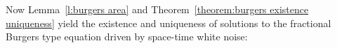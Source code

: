 \documentclass[11pt,a4paper]{article}
\theoremstyle{remark}
\newtheorem{remark}[theorem]{Remark}
\newcommand{\N}{\mathbb{N}}
\begin{document}
%   

Now Lemma~\ref{l:burgers area} and Theorem~\ref{theorem:burgers existence uniqueness} yield the existence and uniqueness of solutions to the fractional Burgers type equation driven by space-time white noise:
\end{document}
